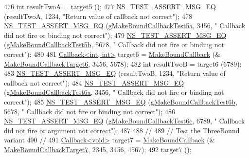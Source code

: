 \begin{DoxyCode}
476   \textcolor{keywordtype}{int} resultTwoA = target5 ();
477   \hyperlink{group__testing_ga2a9d78cffb3db8e867c35fff0b698cf5}{NS\_TEST\_ASSERT\_MSG\_EQ} (resultTwoA, 1234, \textcolor{stringliteral}{"Return value of callback not correct"});
478   \hyperlink{group__testing_ga2a9d78cffb3db8e867c35fff0b698cf5}{NS\_TEST\_ASSERT\_MSG\_EQ} (\hyperlink{callback-test-suite_8cc_a13d61f210cc232207f749f18adbeac68}{gMakeBoundCallbackTest5a}, 3456, \textcolor{stringliteral}{"
      Callback did not fire or binding not correct"});
479   \hyperlink{group__testing_ga2a9d78cffb3db8e867c35fff0b698cf5}{NS\_TEST\_ASSERT\_MSG\_EQ} (\hyperlink{callback-test-suite_8cc_a73d2d3738711a7ffa020bd2f9a6047f6}{gMakeBoundCallbackTest5b}, 5678, \textcolor{stringliteral}{"
      Callback did not fire or binding not correct"});
480 
481   \hyperlink{classns3_1_1Callback}{Callback<int, int>} target6 = \hyperlink{group__makeboundcallback_ga1725d6362e6065faa0709f7c93f8d770}{MakeBoundCallback} (&
      \hyperlink{callback-test-suite_8cc_a763e49a4c1a91bb41e8c3754289aa029}{MakeBoundCallbackTarget6}, 3456, 5678);
482   \textcolor{keywordtype}{int} resultTwoB = target6 (6789);
483   \hyperlink{group__testing_ga2a9d78cffb3db8e867c35fff0b698cf5}{NS\_TEST\_ASSERT\_MSG\_EQ} (resultTwoB, 1234, \textcolor{stringliteral}{"Return value of callback not correct"});
484   \hyperlink{group__testing_ga2a9d78cffb3db8e867c35fff0b698cf5}{NS\_TEST\_ASSERT\_MSG\_EQ} (\hyperlink{callback-test-suite_8cc_a80c930d6600e3ec5df67a4f96c82bc08}{gMakeBoundCallbackTest6a}, 3456, \textcolor{stringliteral}{"
      Callback did not fire or binding not correct"});
485   \hyperlink{group__testing_ga2a9d78cffb3db8e867c35fff0b698cf5}{NS\_TEST\_ASSERT\_MSG\_EQ} (\hyperlink{callback-test-suite_8cc_a28424166f0abaca2b5859849a24ff160}{gMakeBoundCallbackTest6b}, 5678, \textcolor{stringliteral}{"
      Callback did not fire or binding not correct"});
486   \hyperlink{group__testing_ga2a9d78cffb3db8e867c35fff0b698cf5}{NS\_TEST\_ASSERT\_MSG\_EQ} (\hyperlink{callback-test-suite_8cc_a4f5ef2a5a13748e5c4235f991d134a64}{gMakeBoundCallbackTest6c}, 6789, \textcolor{stringliteral}{"
      Callback did not fire or argument not correct"});
487 
488   \textcolor{comment}{//}
489   \textcolor{comment}{// Test the ThreeBound variant}
490   \textcolor{comment}{//}
491   \hyperlink{classns3_1_1Callback}{Callback<void>} target7 = \hyperlink{group__makeboundcallback_ga1725d6362e6065faa0709f7c93f8d770}{MakeBoundCallback} (&
      \hyperlink{callback-test-suite_8cc_a5baa7e1ee1f068893c97a20f2bbc2d97}{MakeBoundCallbackTarget7}, 2345, 3456, 4567);
492   target7 ();

\end{DoxyCode}
